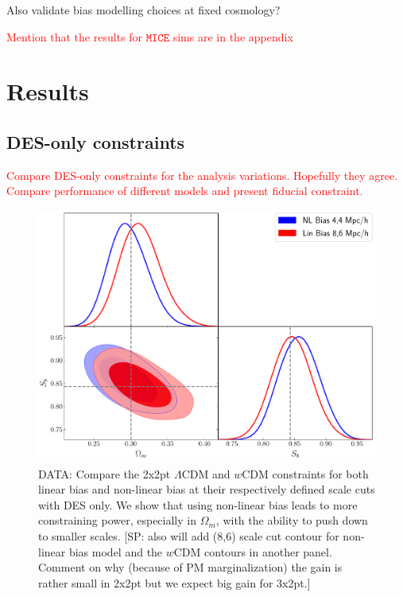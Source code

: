 \documentclass[fleqn,usenatbib]{mnras}
\newcommand{\mice}{\texttt{MICE} }
\newcommand{\SP}[1]{{\color{red}[SP: #1]}}
\newcommand{\red}[1]{\textcolor{red}{#1}}
\begin{document}
Also validate bias modelling choices at fixed cosmology?

\red{Mention that the results for $\mice$ sims are in the appendix}


\section{Results}

\subsection{DES-only constraints}

\red{Compare DES-only constraints for the analysis variations. Hopefully they agree. Compare performance of different models and present fiducial constraint.}







\begin{figure}
\includegraphics[width=\columnwidth]{figs/compare_cosmo_nl44_lin86.pdf}
\caption[]{DATA: Compare the 2x2pt $\Lambda$CDM and $w$CDM constraints for both linear bias and non-linear bias at their respectively defined scale cuts with DES only. We show that using non-linear bias leads to more constraining power, especially in $\Omega_m$, with the ability to push down to smaller scales.  \SP{also will add (8,6) scale cut contour for non-linear bias model and the $w$CDM contours in another panel. Comment on why (because of PM marginalization) the gain is rather small in 2x2pt but we expect big gain for 3x2pt.} }
\label{fig:des_comp}
\end{figure}
\end{document}
